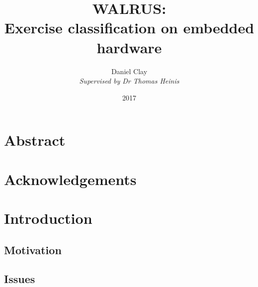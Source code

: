\documentclass[a4paper]{article}
\begin{document}
\title{\textbf{WALRUS:}\\
Exercise classification on embedded hardware}
\date{2017}
\author{
Daniel Clay \\
\emph{Supervised by Dr Thomas Heinis} 
}
\maketitle
\pagebreak

\section{Abstract}


\section{Acknowledgements}



\pagebreak
\tableofcontents
\pagebreak


\section{Introduction}

\subsection{Motivation}%


\subsection{Issues}%
\end{document}

